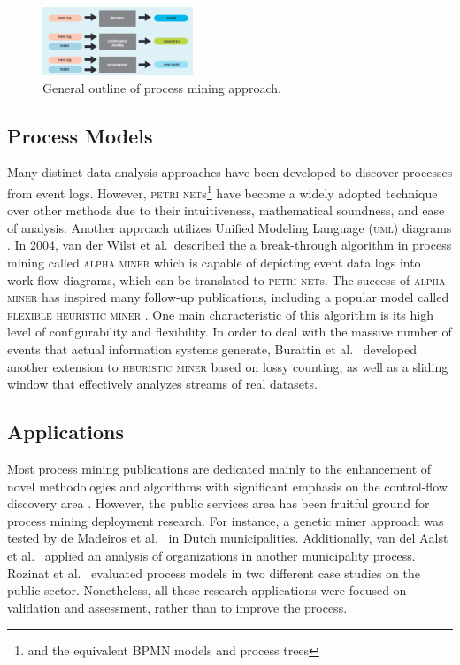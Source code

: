 \documentclass[conference]{IEEEtran}
\begin{document}
\begin{figure}[htbp]
\centerline{\includegraphics[width=0.4\textwidth]{images/image1.png}}
\caption{General outline of process mining approach.}
\label{fig-layout}
\end{figure}

\subsection{Process Models}

Many distinct data analysis approaches have been developed to discover
processes from event logs. However, \textsc{petri net}s\footnote{and the
equivalent BPMN models and process trees} have become a
widely adopted technique over other methods \cite{Cook1998} due to their
intuitiveness, mathematical soundness, and ease of analysis.
Another approach utilizes Unified
Modeling Language (\textsc{uml}) diagrams \cite{Sait2019}.
In 2004, van der Wilst et al.~described the 
a break-through algorithm in process mining
called \textsc{alpha miner}\cite{van2004} which
is capable of depicting event data logs into
work-flow diagrams, which can be translated to \textsc{petri net}s.
The success of \textsc{alpha miner} has inspired many follow-up publications,
including a popular model
called \textsc{flexible heuristic miner} \cite{Weij2006}.
One main characteristic of this
algorithm is its high level of configurability and flexibility.
In order to deal with the
massive number of events that actual information systems generate,
Burattin et al.~\cite{Bura2014} developed another extension to
\textsc{heuristic miner} based on
lossy counting, as well as a sliding window that effectively analyzes
streams of real datasets.

\subsection{Applications}

Most process mining publications are dedicated mainly to the enhancement
of novel methodologies and algorithms with significant emphasis on the
control-flow discovery area \cite{van2004}. However, the public services area
has been fruitful ground
for process mining deployment research. For instance, a
genetic miner approach was tested by de Madeiros et al.~\cite{deMe2007}
in Dutch municipalities. Additionally, van del Aalst et al.~\cite{RoDJ2009}
applied an analysis of organizations in another municipality process.
Rozinat et al.~\cite{RoMa2009} evaluated process models in two different case
studies on the public sector.
Nonetheless, all these research
applications were focused on validation and assessment,
rather than to improve the process.
\end{document}
